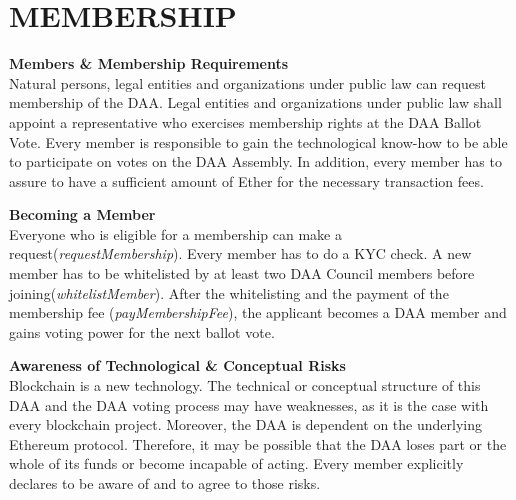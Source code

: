 \section{MEMBERSHIP}\label{sec:membership}

\item \textbf{Members \& Membership Requirements} \\
Natural persons, legal entities and organizations under public law can request membership of the DAA.
Legal entities and organizations under public law shall appoint a representative who exercises membership rights at the DAA Ballot Vote.
Every member is responsible to gain the technological know-how to be able to participate on votes on the DAA Assembly.
In addition, every member has to assure to have a sufficient amount of Ether for the necessary transaction fees.

\item \textbf{Becoming a Member} \\
Everyone who is eligible for a membership can make a request(\emph{requestMembership}).
Every member has to do a KYC check.
A new member has to be whitelisted by at least two DAA Council members before joining(\emph{whitelistMember}).
After the whitelisting and the payment of the membership fee (\emph{payMembershipFee}), the applicant becomes a DAA member and gains voting power for the next ballot vote.

\item \textbf{Awareness of Technological \& Conceptual Risks} \\
Blockchain is a new technology.
The technical or conceptual structure of this DAA and the DAA voting process may have weaknesses, as it is the case with every blockchain project.
Moreover, the DAA is dependent on the underlying Ethereum protocol.
Therefore, it may be possible that the DAA loses part or the whole of its funds or become incapable of acting.
Every member explicitly declares to be aware of and to agree to those risks.

